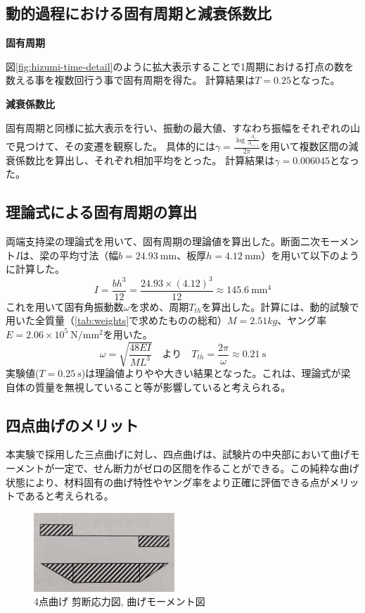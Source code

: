 \documentclass[a4j]{jarticle}
\begin{document}
\subsection{動的過程における固有周期と減衰係数比}
\textbf{固有周期}

図\ref{fig:hizumi-time-detail}のように拡大表示することで1周期における打点の数を数える事を複数回行う事で固有周期を得た。
計算結果は$T=0.25$となった。

\textbf{減衰係数比}

固有周期と同様に拡大表示を行い、振動の最大値、すなわち振幅をそれぞれの山で見つけて、その変遷を観察した。
具体的には$\gamma=\frac{\log{\frac{A_{i}}{A_{i+1}}}}{2\pi}$を用いて複数区間の減衰係数比を算出し、それぞれ相加平均をとった。
計算結果は$\gamma=0.006045$となった。

\subsection{理論式による固有周期の算出}
両端支持梁の理論式を用いて、固有周期の理論値を算出した。断面二次モーメント$I$は、梁の平均寸法（幅$b=24.93 \ \mathrm{mm}$、板厚$h=4.12 \ \mathrm{mm}$）を用いて以下のように計算した。
$$
I = \frac{bh^3}{12} = \frac{24.93 \times (4.12)^3}{12} \approx 145.6 \ \mathrm{mm^4}
$$
これを用いて固有角振動数$\omega$を求め、周期$T_{th}$を算出した。計算には、動的試験で用いた全質量（\ref{tab:weights}で求めたものの総和）$M=2.51kg$、ヤング率$E = 2.06 \times 10^5 \ \mathrm{N/mm^2}$を用いた。
$$
\omega = \sqrt{\frac{48EI}{ML^3}} \quad \text{より} \quad T_{th} = \frac{2\pi}{\omega} \approx 0.21 \ \mathrm{s}
$$
実験値($T = 0.25 \ \mathrm{s}$)は理論値よりやや大きい結果となった。これは、理論式が梁自体の質量を無視していること等が影響していると考えられる。

\subsection{四点曲げのメリット}
本実験で採用した三点曲げに対し、四点曲げは、試験片の中央部において曲げモーメントが一定で、せん断力がゼロの区間を作ることができる。この純粋な曲げ状態により、材料固有の曲げ特性やヤング率をより正確に評価できる点がメリットであると考えられる。
\begin{figure}[H]
    \centering
    \includegraphics[width=0.5\linewidth]{summer/ship-experiment/bend/picture/4tenmage.png}
    \caption{4点曲げ 剪断応力図, 曲げモーメント図}
    \label{fig:4tenmage}
\end{figure}
\end{document}
